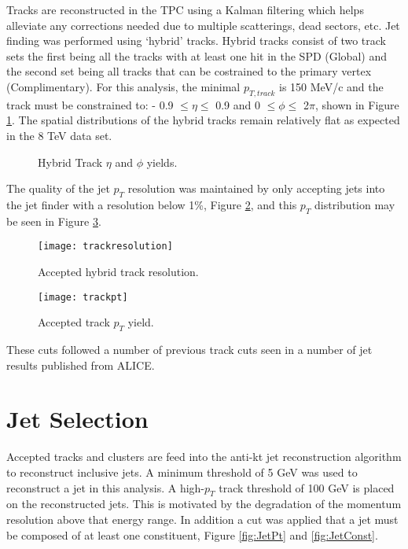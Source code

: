 Tracks are reconstructed in the TPC using a Kalman filtering which helps alleviate any corrections needed due to multiple scatterings, dead sectors, etc.  Jet finding was performed using `hybrid' tracks.  Hybrid tracks consist of two track sets the first being all the tracks with at least one hit in the SPD (Global) and the second set being all tracks that can be costrained to the primary vertex (Complimentary).  For this analysis, the minimal $p_{T, track}$ is 150 MeV/c and the track must be constrained to: - 0.9 $\leq \eta \leq$ 0.9 and 0 $\leq \phi \leq$ 2$\pi$, shown in Figure \ref{fig:Hybridtracketaphi}.  The spatial distributions of the hybrid tracks remain relatively flat as expected in the 8 TeV data set.

\begin{figure}%
    \centering
    \qquad
    \caption{Hybrid Track $\eta$ and $\phi$ yields.}%
    \label{fig:Hybridtracketaphi}%
\end{figure}

\noindent
The quality of the jet $p_{T}$ resolution was maintained by only accepting jets into the jet finder with a resolution below 1\%, Figure \ref{fig:trackresolution}, and this $p_{T}$ distribution may be seen in Figure \ref{fig:hybtrackpt}.

\begin{figure}[h]
\texttt{[image: trackresolution]}
\centering
\caption{Accepted hybrid track resolution.}
\label{fig:trackresolution}
\end{figure}

\begin{figure}[h]
\texttt{[image: trackpt]}
\centering
\caption{Accepted track $p_{T}$ yield.}
\label{fig:hybtrackpt}
\end{figure}

\noindent
These cuts followed a number of previous track cuts seen in a number of jet results published from ALICE\cite{Acharya:2018eat}.
\newpage
\section{Jet Selection}

Accepted tracks and clusters are feed into the anti-kt jet reconstruction algorithm to reconstruct inclusive jets.  A minimum threshold of 5 GeV was used to reconstruct a jet in this analysis.  A high-$p_{T}$ track threshold of 100 GeV is placed on the reconstructed jets.  This is motivated by the degradation of the momentum resolution above that energy range.  In addition a cut was applied that a jet must be composed of at least one constituent, Figure \ref{fig:JetPt} and \ref{fig:JetConst}.

